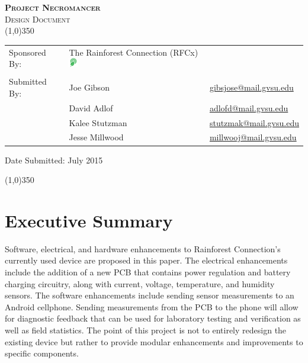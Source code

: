 \documentclass{article}
\newcommand{\ASSNMT}{Project Necromancer}
\newcommand{\CLASS}{Design Document}
\newcommand{\DATE}{July 2015}
\numberwithin{figure}{section}
\numberwithin{equation}{section}
\begin{document}
\begin{flushleft}

\textsc{\LARGE \bfseries \ASSNMT}\\

\textsc{\Large \CLASS}\\[0.2cm]
\linethickness{0.5mm}
{\color{ForestGreen}\line(1,0){350}} \\ [1.0cm]

\begin{flushleft} \large
\begin{tabular}{lll}
  Sponsored By: & The Rainforest Connection (RFCx) \includegraphics[height=0.4cm]{rfcxlogo} & \\
                &               & \\
  Submitted By: & Joe Gibson    & \href{mailto:gibsjose@mail.gvsu.edu}{gibsjose@mail.gvsu.edu}\\
              & David Adlof     & \href{mailto:adlofd@mail.gvsu.edu}{adlofd@mail.gvsu.edu}\\
              & Kalee Stutzman  & \href{mailto:stutzmak@mail.gvsu.edu}{stutzmak@mail.gvsu.edu}\\
              & Jesse Millwood  & \href{mailto:millwooj@mail.gvsu.edu}{millwooj@mail.gvsu.edu}\\
\end{tabular}

\bigskip

\bigskip
Date Submitted: \DATE
\end{flushleft}

\smallskip
{\color{ForestGreen}\line(1,0){350}} \\ [1.0cm]
\section*{Executive Summary} \label{sect:execsum}
Software, electrical, and hardware enhancements to Rainforest Connection’s currently used device are proposed in this paper. The electrical enhancements include the addition of a new PCB that contains power regulation and battery charging circuitry, along with current, voltage, temperature, and humidity sensors. The software enhancements include sending sensor measurements to an Android cellphone. Sending measurements from the PCB to the phone will allow for diagnostic feedback that can be used for laboratory testing and verification as well as field statistics. The point of this project is not to entirely redesign the existing device but rather to provide modular enhancements and improvements to specific components.


\end{flushleft}
\end{document}

